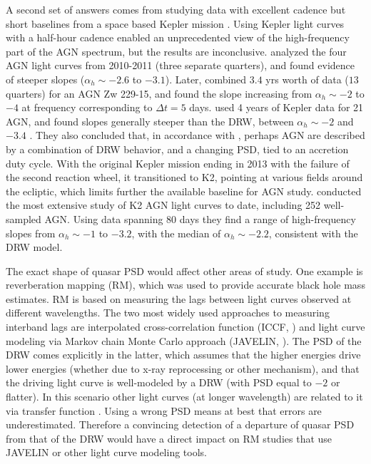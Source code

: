 \documentclass[twocolumn]{aastex62}
\begin{document}
A second set of answers comes from studying data with excellent cadence but short baselines from a space based Kepler mission \citep{borucki2010}. Using Kepler light curves   with a half-hour cadence enabled an unprecedented view of the high-frequency part of the AGN spectrum, but the results are inconclusive. \cite{mushotzky2011}  analyzed the four AGN light curves from 2010-2011 (three separate quarters), and found evidence of steeper slopes ($\alpha_{h} {\sim} -2.6 $ to $ -3.1$).  Later,  \cite{edelson2014} combined $3.4$ yrs worth of data ($13$ quarters)  for an AGN Zw 229-15, and found the slope increasing from $\alpha_{h} {\sim} -2 $ to $ -4 $ at frequency corresponding to $\Delta t = 5$ days. \cite{smith2018} used 4 years of Kepler data for 21 AGN,  and found slopes generally steeper than the DRW, between $\alpha_{h} {\sim} -2$ and $-3.4$ . They also concluded that, in accordance with \cite{caplar2017}, perhaps AGN are described by a combination of DRW behavior, and a changing PSD, tied to an accretion duty cycle. With the original  Kepler  mission ending in   2013 with the failure of the second reaction wheel,  it transitioned to K2, pointing at various fields around the ecliptic, which limits further the available baseline for AGN study.  \citet{aranzana2018} conducted the most extensive study of K2 AGN light curves to date, including 252 well-sampled AGN. Using data spanning 80 days they find a range of high-frequency slopes from $\alpha_{h} {\sim} -1$ to $-3.2$, with the median of $\alpha_{h} {\sim} -2.2$,  consistent with the DRW model.



The exact shape of quasar PSD would affect other areas of study. One example is reverberation mapping (RM), which was used to provide  accurate black hole mass estimates. RM is based on measuring the lags between light curves observed at different wavelengths. The two most widely used approaches to measuring interband lags are interpolated cross-correlation function (ICCF, \citealt{gaskell1987, peterson2004})  and  light curve modeling via Markov chain Monte Carlo approach (JAVELIN, \citealt{zu2011}). The PSD of the DRW comes explicitly in the latter,  which assumes that the higher energies drive lower energies (whether due to x-ray reprocessing or other mechanism), and that the driving light curve is well-modeled by a DRW (with PSD equal to  $-2$ or flatter).  In this scenario other light curves (at longer wavelength) are related to it via transfer function \cite{edelson2019}. Using a wrong PSD means at best that errors are underestimated. Therefore a convincing detection of a departure of quasar PSD from that of the DRW  would have  a direct impact on RM studies that use  JAVELIN or other light curve modeling tools. 
\end{document}
